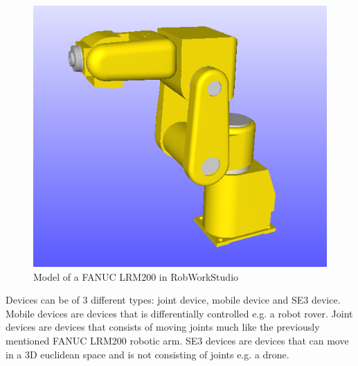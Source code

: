 \begin{figure}[h]
	\centering
	\includegraphics[scale=0.55]{Figures/FANUCLRM200.png}
	\caption{Model of a FANUC LRM200 in RobWorkStudio}
	\label{fig:FANUCLRM200}
\end{figure}

Devices can be of 3 different types: joint device, mobile device and SE3 device. Mobile devices are devices that  is differentially controlled e.g. a robot rover. Joint devices are devices that consists of moving joints much like the previously mentioned FANUC LRM200 robotic arm. SE3 devices are devices that can move in a 3D euclidean space and is not consisting of joints e.g. a drone.\\

